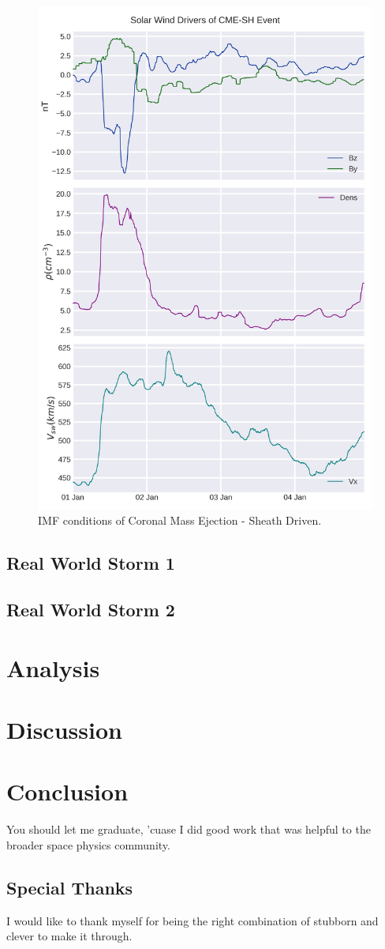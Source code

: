 \documentclass[utf8]{report}
\begin{document}
\begin{figure}[!ht]
\begin{center}
\includegraphics{Ideal_Sheath.png}
\caption{IMF conditions of Coronal Mass Ejection - Sheath Driven.}
\label{fig:4}
\end{center}
\end{figure}

\section{Real World Storm 1}
\section {Real World Storm 2}

\chapter{Analysis}

\chapter{Discussion}

\chapter{Conclusion}
You should let me graduate, 'cuase I did good work that was helpful to the broader space physics community.

\section{Special Thanks}

I would like to thank myself for being the right combination of stubborn and clever to make it through. 
\end{document}
